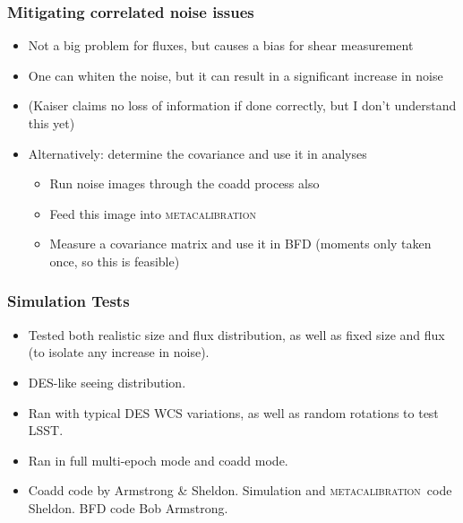 \documentclass{beamer}
\newcommand{\mcal}{\textsc{metacalibration}}
\begin{document}
\frame
{
    \frametitle{Mitigating correlated noise issues}

 
    \begin{itemize}

        \item Not a big problem for fluxes, but causes a bias for shear measurement

        \item One can whiten the noise, but it can result in a significant increase in noise

        \item (Kaiser claims no loss of information if done correctly, but I don't understand this yet)

        \item Alternatively: determine the covariance and use it in analyses
            \begin{itemize}
                \item Run noise images through the coadd process also
                \item Feed this image into \mcal
                \item Measure a covariance matrix and use it in BFD (moments only taken once, so this is feasible)
            \end{itemize}


    \end{itemize}

}

\frame
{
    \frametitle{Simulation Tests}

 
    \begin{itemize}

        \item Tested both realistic size and flux distribution, as well as
            fixed size and flux (to isolate any increase in noise).

        \item DES-like seeing distribution.

        \item Ran with typical DES WCS variations, as well as random rotations to test LSST.

        \item Ran in full multi-epoch mode and coadd mode.

        \item Coadd code by Armstrong \& Sheldon.  Simulation and \mcal\ code
            Sheldon.  BFD code Bob Armstrong.

    \end{itemize}

}
\end{document}
